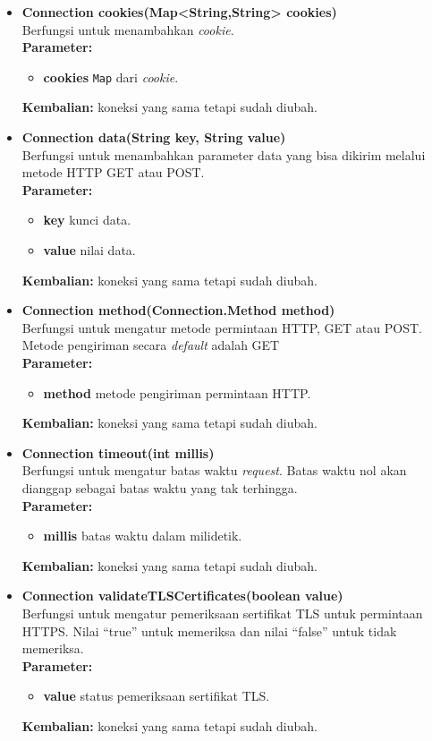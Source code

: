 \begin{itemize}
	\item \textbf{Connection cookies(Map<String,String> cookies)} \\
		Berfungsi untuk menambahkan \textit{cookie}. \\
		\textbf{Parameter:}
		\begin{itemize}
			\item \textbf{cookies} \texttt{Map} dari \textit{cookie}.
		\end{itemize}
		\textbf{Kembalian:} koneksi yang sama tetapi sudah diubah.
		
		\item \textbf{Connection data(String key, String value)} \\
		Berfungsi untuk menambahkan parameter data yang bisa dikirim melalui metode HTTP GET atau POST. \\
		\textbf{Parameter:}
		\begin{itemize}
			\item \textbf{key} kunci data.
			\item \textbf{value} nilai data.
		\end{itemize}
		\textbf{Kembalian:} koneksi yang sama tetapi sudah diubah.
		
		\item \textbf{Connection method(Connection.Method method)} \\
		Berfungsi untuk mengatur metode permintaan HTTP, GET atau POST. Metode pengiriman secara \textit{default} adalah GET\\
		\textbf{Parameter:}
		\begin{itemize}
			\item \textbf{method} metode pengiriman permintaan HTTP.
		\end{itemize}
		\textbf{Kembalian:} koneksi yang sama tetapi sudah diubah.
		
		\item \textbf{Connection timeout(int millis)} \\
		Berfungsi untuk mengatur batas waktu \textit{request}. Batas waktu nol akan dianggap sebagai batas waktu yang tak terhingga. \\
		\textbf{Parameter:}
		\begin{itemize}
			\item \textbf{millis} batas waktu dalam milidetik.
		\end{itemize}
		\textbf{Kembalian:} koneksi yang sama tetapi sudah diubah.
		
		\item \textbf{Connection validateTLSCertificates(boolean value)} \\
		Berfungsi untuk mengatur pemeriksaan sertifikat TLS untuk permintaan HTTPS. Nilai ``true'' untuk memeriksa dan nilai ``false'' untuk tidak memeriksa.\\
		\textbf{Parameter:}
		\begin{itemize}
			\item \textbf{value} status pemeriksaan sertifikat TLS.
		\end{itemize}
		\textbf{Kembalian:} koneksi yang sama tetapi sudah diubah.
		

\end{itemize}
